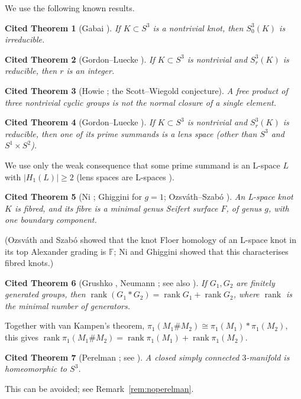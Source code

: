 \documentclass[11pt]{article}
\newtheorem{citedthm}{Cited Theorem}
\theoremstyle{definition}
\newcommand{\F}{\mathbb{F}}
\newcommand{\rk}{\operatorname{rank}}
\begin{document}
\medskip
We use the following known results.

\begin{citedthm}[Gabai \cite{Gabai}]\label{thm:gabai}
If $K\subset S^3$ is a nontrivial knot, then $S^3_0(K)$ is irreducible.
\end{citedthm}

\begin{citedthm}[Gordon--Luecke \cite{GL87}]\label{thm:GL87}
If $K\subset S^3$ is nontrivial and $S^3_r(K)$ is reducible, then $r$ is an integer.
\end{citedthm}

\begin{citedthm}[Howie \cite{Howie}; the Scott--Wiegold conjecture]\label{thm:howie}
A free product of three nontrivial cyclic groups is not the normal closure of a single element.
\end{citedthm}

\begin{citedthm}[Gordon--Luecke \cite{GL96}]\label{thm:GL96}
If $K\subset S^3$ is nontrivial and $S^3_r(K)$ is reducible, then one of its prime summands is a lens space (other than $S^3$ and $S^1\times S^2$).
\end{citedthm}
We use only the weak consequence that some prime summand is an L-space $L$ with $|H_1(L)|\ge 2$ (lens spaces are L-spaces \cite{OSlens}).

\begin{citedthm}[Ni \cite{Ni}; Ghiggini \cite{Ghiggini} for $g=1$; Ozsv\'ath--Szab\'o \cite{OSlens}]\label{thm:fibred}
An L-space knot $K$ is fibred, and its fibre is a minimal genus Seifert surface $F$, of genus $g$, with one boundary component.
\end{citedthm}
(Ozsv\'ath and Szab\'o \cite{OSlens} showed that the knot Floer homology of an L-space knot in its top Alexander grading is $\F$; Ni and Ghiggini showed that this characterises fibred knots.)

\begin{citedthm}[Grushko \cite{Grushko}, Neumann \cite{Neumann}; see also \cite{LS}]\label{thm:grushko}
If $G_1,G_2$ are finitely generated groups, then $\rk(G_1*G_2)=\rk G_1+\rk G_2$, where $\rk$ is the minimal number of generators.
\end{citedthm}
Together with van Kampen's theorem, $\pi_1(M_1\# M_2)\cong\pi_1(M_1)*\pi_1(M_2)$, this gives $\rk\pi_1(M_1\#M_2)=\rk\pi_1(M_1)+\rk\pi_1(M_2)$.

\begin{citedthm}[Perelman \cite{Perelman1,Perelman2,Perelman3}; see \cite{MorganTian}]\label{thm:perelman}
A closed simply connected $3$-manifold is homeomorphic to $S^3$.
\end{citedthm}
This can be avoided; see Remark~\ref{rem:noperelman}.
\end{document}
